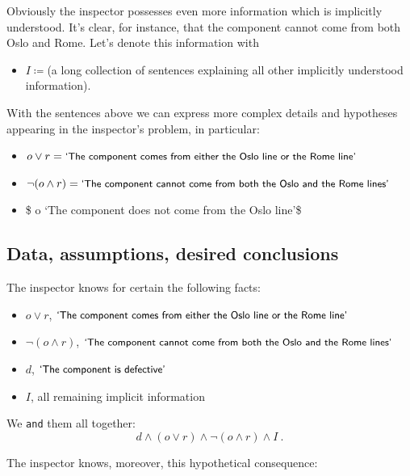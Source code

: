\documentclass[
  a4paper,
  DIV=11,
  numbers=noendperiod,
  oneside]{scrreprt}
\providecommand{\tightlist}{%
  \setlength{\itemsep}{0pt}\setlength{\parskip}{0pt}}\usepackage{longtable,booktabs,array}
\begin{document}
Obviously the inspector possesses even more information which is
implicitly understood. It's clear, for instance, that the component
cannot come from both Oslo and Rome. Let's denote this information with

\begin{itemize}
\tightlist
\item
  \(I \coloneqq{}\)(a long collection of sentences explaining all other
  implicitly understood information).\\
\end{itemize}

With the sentences above we can express more complex details and
hypotheses appearing in the inspector's problem, in particular:

\begin{itemize}
\item
  \(o \lor r = \textsf{\small`The component comes from either the Oslo line or the Rome line'}\)
\item
  \(\lnot(o \land r) = \textsf{\small`The component cannot come from both the Oslo and the Rome lines'}\)
\item
  \$ \lnot o
  \coloneqq \textsf{\small`The component does not come from the Oslo line'}\$
\end{itemize}

\hypertarget{data-assumptions-desired-conclusions}{%
\subsection{Data, assumptions, desired
conclusions}\label{data-assumptions-desired-conclusions}}

The inspector knows for certain the following facts:

\begin{itemize}
\item
  \(o \lor r\),
  \(\textsf{\small`The component comes from either the Oslo line or the Rome line'}\)
\item
  \(\lnot(o \land r)\),
  \(\textsf{\small`The component cannot come from both the Oslo and the Rome lines'}\)
\item
  \(d\), \(\textsf{\small`The component is defective'}\)
\item
  \(I\), all remaining implicit information
\end{itemize}

We \texttt{and} them all together: \[
d \land (o \lor r) \land \lnot (o \land r) \land I \ .
\]

The inspector knows, moreover, this hypothetical consequence:
\end{document}
